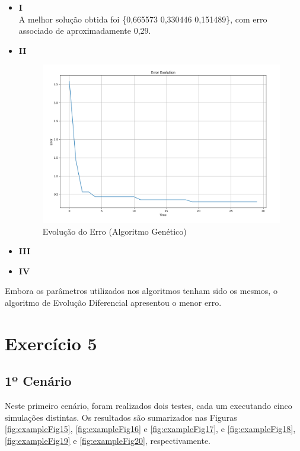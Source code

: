 \documentclass[a4paper, 12pt]{article}
\begin{document}
\begin{itemize}
    \item \textbf{I}\\
    A melhor solução obtida foi \{0,665573 \textbar\hspace{0.1cm} 0,330446 \textbar\hspace{0.1cm} 0,151489\}, com erro associado de aproximadamente 0,29.
    \item \textbf{II}
    \begin{figure}[H]
        \centering
        \includegraphics[width=1\textwidth]{Images/Exercise 4/ga_error.png}
        \vspace*{-1cm}
        \caption{Evolução do Erro (Algoritmo Genético)}
        \label{fig:exampleFig14}
    \end{figure}
    \item \textbf{III}
    \item \textbf{IV}
\end{itemize}

Embora os parâmetros utilizados nos algoritmos tenham sido os mesmos, o algoritmo de Evolução Diferencial apresentou o menor erro.

\section*{Exercício 5}

\subsection*{1º Cenário}

Neste primeiro cenário, foram realizados dois testes, cada um executando cinco simulações distintas. Os resultados são sumarizados nas Figuras \ref{fig:exampleFig15}, \ref{fig:exampleFig16} e \ref{fig:exampleFig17}, e \ref{fig:exampleFig18}, \ref{fig:exampleFig19} e \ref{fig:exampleFig20}, respectivamente.
\end{document}
